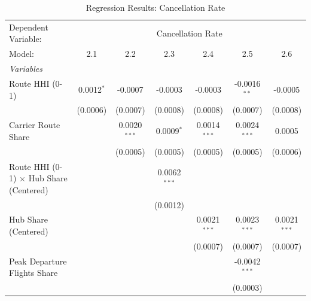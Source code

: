 \documentclass[preprint,12pt,authoryear]{elsarticle}
\begin{document}
\begin{table}
   \caption{\label{tab:my_reg_results2} Regression Results: Cancellation Rate}
   \centering
   \setlength{\tabcolsep}{1pt}
   \begin{tabular}{lcccccc}
      \tabularnewline \midrule \midrule
      Dependent Variable: & \multicolumn{6}{c}{Cancellation Rate}\\
      Model:                            & 2.1                   & 2.2                   & 2.3            & 2.4                   & 2.5             & 2.6\\  
      \midrule
      \emph{Variables}\\
      Route HHI (0-1)                   & 0.0012$^{*}$          & -0.0007               & -0.0003        & -0.0003               & -0.0016$^{**}$  & -0.0005\\   
                                        & (0.0006)              & (0.0007)              & (0.0008)       & (0.0008)              & (0.0007)        & (0.0008)\\   
      Carrier Route Share               &                       & 0.0020$^{***}$        & 0.0009$^{*}$   & 0.0014$^{***}$        & 0.0024$^{***}$  & 0.0005\\   
                                        &                       & (0.0005)              & (0.0005)       & (0.0005)              & (0.0005)        & (0.0006)\\   
      Route HHI (0-1) $\times$ Hub Share (Centered)   &                       &         & 0.0062$^{***}$ &                       &                 &   \\   
                                        &                       &                       & (0.0012)       &                       &                 &   \\   
      Hub Share (Centered)              &                       &                       &                & 0.0021$^{***}$        & 0.0023$^{***}$  & 0.0021$^{***}$\\   
                                        &                       &                       &                & (0.0007)              & (0.0007)        & (0.0007)\\   
      Peak Departure Flights Share      &                       &                       &                &                       & -0.0042$^{***}$ &   \\   
                                        &                       &                       &                &                       & (0.0003)        &   \\   

\end{tabular}
\end{table}
\end{document}

